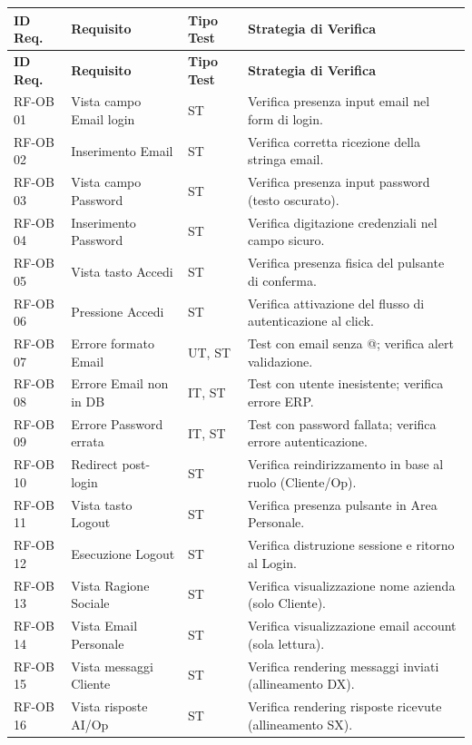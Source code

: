 \documentclass[a4paper,11pt,oneside]{scrartcl}
\begin{document}
\begin{longtable}{|p{1.5cm}|p{4.5cm}|p{1.8cm}|p{6cm}|}
\hline
\textbf{ID Req.} & \textbf{Requisito} & \textbf{Tipo Test} & \textbf{Strategia di Verifica} \\
\hline
\endfirsthead
\hline
\textbf{ID Req.} & \textbf{Requisito} & \textbf{Tipo Test} & \textbf{Strategia di Verifica} \\
\hline
\endhead

RF-OB 01 & Vista campo Email login & ST & Verifica presenza input email nel form di login. \\ \hline
RF-OB 02 & Inserimento Email & ST & Verifica corretta ricezione della stringa email. \\ \hline
RF-OB 03 & Vista campo Password & ST & Verifica presenza input password (testo oscurato). \\ \hline
RF-OB 04 & Inserimento Password & ST & Verifica digitazione credenziali nel campo sicuro. \\ \hline
RF-OB 05 & Vista tasto Accedi & ST & Verifica presenza fisica del pulsante di conferma. \\ \hline
RF-OB 06 & Pressione Accedi & ST & Verifica attivazione del flusso di autenticazione al click. \\ \hline
RF-OB 07 & Errore formato Email & UT, ST & Test con email senza @; verifica alert validazione. \\ \hline
RF-OB 08 & Errore Email non in DB & IT, ST & Test con utente inesistente; verifica errore ERP. \\ \hline
RF-OB 09 & Errore Password errata & IT, ST & Test con password fallata; verifica errore autenticazione. \\ \hline
RF-OB 10 & Redirect post-login & ST & Verifica reindirizzamento in base al ruolo (Cliente/Op). \\ \hline
RF-OB 11 & Vista tasto Logout & ST & Verifica presenza pulsante in Area Personale. \\ \hline
RF-OB 12 & Esecuzione Logout & ST & Verifica distruzione sessione e ritorno al Login. \\ \hline
RF-OB 13 & Vista Ragione Sociale & ST & Verifica visualizzazione nome azienda (solo Cliente). \\ \hline
RF-OB 14 & Vista Email Personale & ST & Verifica visualizzazione email account (sola lettura). \\ \hline
RF-OB 15 & Vista messaggi Cliente & ST & Verifica rendering messaggi inviati (allineamento DX). \\ \hline
RF-OB 16 & Vista risposte AI/Op & ST & Verifica rendering risposte ricevute (allineamento SX). \\ \hline

\end{longtable}
\end{document}
